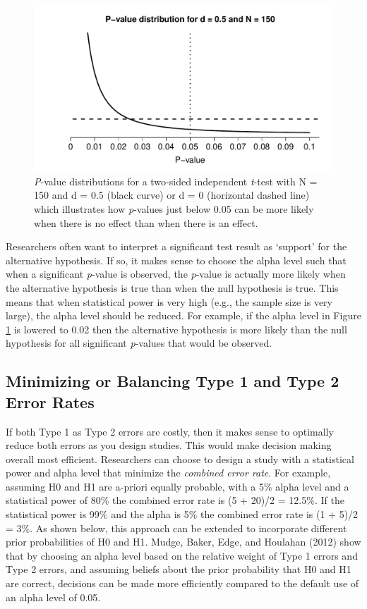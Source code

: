 \documentclass[
  english,
  ,jou,floatsintext]{apa6}
\begin{document}
\begin{figure}
\centering
\includegraphics{Justify_in_Practice_files/figure-latex/p-plot-1.pdf}
\caption{\label{fig:p-plot}\emph{P}-value distributions for a two-sided independent \emph{t}-test with N = 150 and d = 0.5 (black curve) or d = 0 (horizontal dashed line) which illustrates how \emph{p}-values just below 0.05 can be more likely when there is no effect than when there is an effect.}
\end{figure}

Researchers often want to interpret a significant test result as `support' for the alternative hypothesis. If so, it makes sense to choose the alpha level such that when a significant \emph{p}-value is observed, the \emph{p}-value is actually more likely when the alternative hypothesis is true than when the null hypothesis is true. This means that when statistical power is very high (e.g., the sample size is very large), the alpha level should be reduced. For example, if the alpha level in Figure \ref{fig:p-plot} is lowered to 0.02 then the alternative hypothesis is more likely than the null hypothesis for all significant \emph{p}-values that would be observed.

\hypertarget{minimizing-or-balancing-type-1-and-type-2-error-rates}{%
\subsection{Minimizing or Balancing Type 1 and Type 2 Error Rates}\label{minimizing-or-balancing-type-1-and-type-2-error-rates}}

If both Type 1 as Type 2 errors are costly, then it makes sense to optimally reduce both errors as you design studies. This would make decision making overall most efficient. Researchers can choose to design a study with a statistical power and alpha level that minimize the \emph{combined error rate}. For example, assuming H0 and H1 are a-priori equally probable, with a 5\% alpha level and a statistical power of 80\% the combined error rate is (5 + 20)/2 = 12.5\%. If the statistical power is 99\% and the alpha is 5\% the combined error rate is (1 + 5)/2 = 3\%. As shown below, this approach can be extended to incorporate different prior probabilities of H0 and H1. Mudge, Baker, Edge, and Houlahan (2012) show that by choosing an alpha level based on the relative weight of Type 1 errors and Type 2 errors, and assuming beliefs about the prior probability that H0 and H1 are correct, decisions can be made more efficiently compared to the default use of an alpha level of 0.05.
\end{document}
